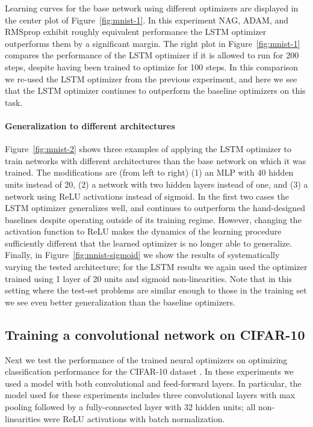 \documentclass{article}
\begin{document}
Learning curves for the base network using different optimizers are displayed
in the center plot of Figure~\ref{fig:mnist-1}. In this experiment NAG, ADAM,
and RMSprop exhibit roughly equivalent performance the LSTM optimizer
outperforms them by a significant margin. The right plot in
Figure~\ref{fig:mnist-1} compares the performance of the LSTM optimizer if it
is allowed to run for 200 steps, despite having been trained to optimize for
100 steps.  In this comparison we re-used the LSTM optimizer from the previous
experiment, and here we see that the LSTM optimizer continues to outperform the
baseline optimizers on this task.

\paragraph{Generalization to different architectures} Figure~\ref{fig:mnist-2}
shows three examples of applying the LSTM optimizer to train networks with
different architectures than the base network on which it was trained.  The
modifications are (from left to right) (1) an MLP with 40 hidden units instead
of 20, (2) a network with two hidden layers instead of one, and (3) a network
using ReLU activations instead of sigmoid.  In the first two cases the LSTM
optimizer generalizes well, and continues to outperform the hand-designed
baselines despite operating outside of its training regime.  However, changing
the activation function to ReLU makes the dynamics of the learning procedure
sufficiently different that the learned optimizer is no longer able to
generalize. Finally, in Figure~\ref{fig:mnist-sigmoid} we show the results of
systematically varying the tested architecture; for the LSTM results we again
used the optimizer trained using 1 layer of 20 units and sigmoid
non-linearities. Note that in this setting where the test-set problems are
similar enough to those in the training set we see even better generalization
than the baseline optimizers.

\subsection{Training a convolutional network on CIFAR-10}

Next we test the performance of the trained neural optimizers on optimizing
classification performance for the CIFAR-10 dataset \citep{krizhevsky:2009}. In
these experiments we used a model with both convolutional and feed-forward
layers. In particular, the model used for these experiments includes three
convolutional layers with max pooling followed by a fully-connected layer with
32 hidden units; all non-linearities were ReLU activations with batch
normalization.
\end{document}
